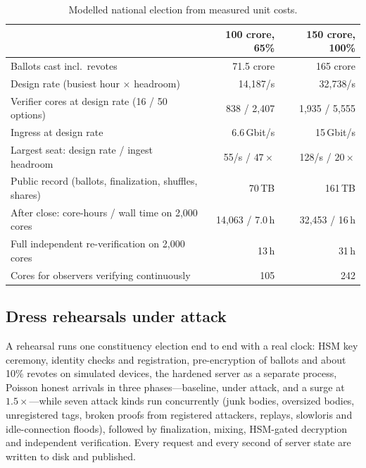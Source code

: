 \documentclass[runningheads]{llncs}
\begin{document}
\begin{table}[t]
\caption{Modelled national election from measured unit costs.}\label{tab:model}
\centering
\small
\begin{tabular}{@{}lrr@{}}
\toprule
 & 100 crore, 65\% & 150 crore, 100\% \\
\midrule
Ballots cast incl.\ revotes & 71.5 crore & 165 crore \\
Design rate (busiest hour $\times$ headroom) & 14,187/s & 32,738/s \\
Verifier cores at design rate (16 / 50 options) & 838 / 2,407 & 1,935 / 5,555 \\
Ingress at design rate & 6.6\,Gbit/s & 15\,Gbit/s \\
Largest seat: design rate / ingest headroom & 55/s / $47\times$ & 128/s / $20\times$ \\
Public record (ballots, finalization, shuffles, shares) & 70\,TB & 161\,TB \\
After close: core-hours / wall time on 2,000 cores & 14,063 / 7.0\,h & 32,453 / 16\,h \\
Full independent re-verification on 2,000 cores & 13\,h & 31\,h \\
Cores for observers verifying continuously & 105 & 242 \\
\bottomrule
\end{tabular}
\end{table}

\subsection{Dress rehearsals under attack}\label{sec:rehearsal}

A rehearsal runs one constituency election end to end with a real clock: HSM key ceremony, identity checks and registration, pre-encryption of ballots and about 10\% revotes on simulated devices, the hardened server as a separate process, Poisson honest arrivals in three phases---baseline, under attack, and a surge at $1.5\times$---while seven attack kinds run concurrently (junk bodies, oversized bodies, unregistered tags, broken proofs from registered attackers, replays, slowloris and idle-connection floods), followed by finalization, mixing, HSM-gated decryption and independent verification. Every request and every second of server state are written to disk and published.
\end{document}
